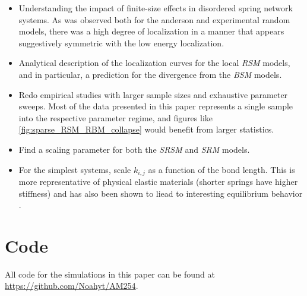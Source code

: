 \documentclass{article}
\begin{document}
\begin{itemize}
	\item Understanding the impact of finite-size effects in disordered spring network systems. 
		As was observed both for the anderson and experimental random models, there was a high degree of localization 
		in a manner that appears suggestively symmetric with the low energy localization.
	\item Analytical description of the localization curves for the local \textit{RSM} models, and in particular, a prediction for the divergence from the \textit{BSM} models.
	\item Redo empirical studies with larger sample sizes and exhaustive parameter sweeps. Most of the data presented in this paper represents a single sample into the respective parameter regime, and figures like \ref{fig:sparse_RSM_RBM_collapse} would benefit from larger statistics.
	\item Find a scaling parameter for both the \textit{SRSM} and \textit{SRM} models.
	\item For the simplest systems, scale $k_{i,j}$ as a function of the bond length. 
		This is more representative of physical elastic materials (shorter springs have higher stiffness) and has also been shown to liead to interesting equilibrium behavior \cite{Adam2022-qd}.
\end{itemize}

\section{Code}

All code for the simulations in this paper can be found at \href{https://github.com/Noahyt/AM254}{https://github.com/Noahyt/AM254}.


\end{document}
